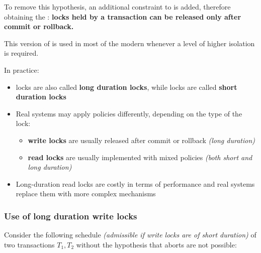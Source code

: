 \documentclass[english]{article}
\begin{document}
To remove this hypothesis, an additional constraint to \TPL is added, therefore obtaining the \textbf{\STPL}:
\textbf{locks held by a transaction can be released only after commit or rollback.}

This version of \TPL is used in most of the modern \dbms whenever a level of higher isolation is required.

\bigskip
In practice:
\begin{itemize}
  \item \STPL locks are also called \textbf{long duration locks}, while \TPL locks are called \textbf{short duration locks}
  \item Real systems may apply \TPL policies differently, depending on the type of the lock:
        \begin{itemize}
          \item \textbf{write locks} are usually released after commit or rollback \textit{(long duration)}
          \item \textbf{read locks} are usually implemented with mixed policies \textit{(both short and long duration)}
        \end{itemize}
  \item Long-duration read locks are costly in terms of performance and real systems replace them with more complex mechanisms
\end{itemize}

\subsubsection{Use of long duration write locks}

Consider the following schedule \textit{(admissible if write locks are of short duration)} of two transactions \(T_1, T_2\) without the hypothesis that aborts are not possible:
\end{document}

